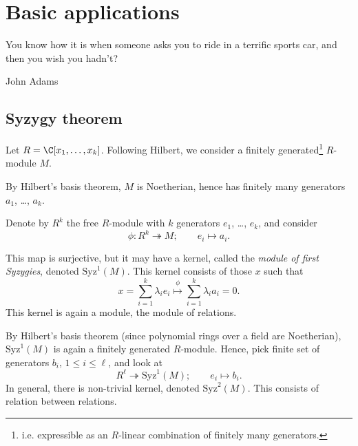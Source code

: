 \documentclass[main.tex]{subfiles}
\begin{document}
\chapter{Basic applications}
\label{ch:basic_applications}

\epigraph{You know how it is when someone asks you to ride in a terrific sports car, and then you wish you hadn't?}{John Adams}

\section{Syzygy theorem}
\label{sec:syzygy_theorem}

Let $R = \C[x_{1}, \ldots, x_{k}]$. Following Hilbert, we consider a finitely generated\footnote{i.e. expressible as an $R$-linear combination of finitely many generators.} $R$-module $M$.

By Hilbert's basis theorem, $M$ is Noetherian, hence has finitely many generators $a_{1}$, \dots, $a_{k}$.

Denote by $R^{k}$ the free $R$-module with $k$ generators $e_{1}$, \dots, $e_{k}$, and consider
\begin{equation*}
  \phi\colon R^{k} \twoheadrightarrow M;\qquad e_{i} \mapsto a_{i}.
\end{equation*}

This map is surjective, but it may have a kernel, called the \emph{module of first Syzygies}, denoted $\mathrm{Syz}^{1}(M)$. This kernel consists of those $x$ such that
\begin{equation*}
  x = \sum_{i = 1}^{k} \lambda_{i} e_{i} \overset{\phi}{\mapsto} \sum_{i = 1}^{k} \lambda_{i} a_{i} = 0.
\end{equation*}
This kernel is again a module, the module of relations.

By Hilbert's basis theorem (since polynomial rings over a field are Noetherian), $\mathrm{Syz}^{1}(M)$ is again a finitely generated $R$-module. Hence, pick finite set of generators $b_{i}$, $1 \leq i \leq \ell$, and look at
\begin{equation*}
  R^{\ell} \twoheadrightarrow \mathrm{Syz}^{1}(M);\qquad e_{i} \mapsto b_{i}.
\end{equation*}
In general, there is non-trivial kernel, denoted $\mathrm{Syz}^{2}(M)$. This consists of relation between relations.
\end{document}
